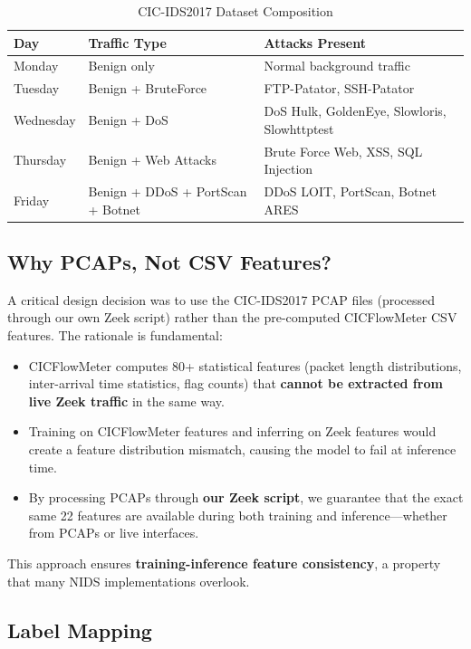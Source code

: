 \documentclass[12pt,a4paper,twoside]{report}
\begin{document}
\begin{table}[H]
\centering
\caption{CIC-IDS2017 Dataset Composition}
\begin{tabularx}{\textwidth}{llX}
\toprule
\textbf{Day} & \textbf{Traffic Type} & \textbf{Attacks Present} \\
\midrule
Monday & Benign only & Normal background traffic \\
Tuesday & Benign + BruteForce & FTP-Patator, SSH-Patator \\
Wednesday & Benign + DoS & DoS Hulk, GoldenEye, Slowloris, Slowhttptest \\
Thursday & Benign + Web Attacks & Brute Force Web, XSS, SQL Injection \\
Friday & Benign + DDoS + PortScan + Botnet & DDoS LOIT, PortScan, Botnet ARES \\
\bottomrule
\end{tabularx}
\end{table}

\subsection{Why PCAPs, Not CSV Features?}

A critical design decision was to use the CIC-IDS2017 PCAP files (processed through our own Zeek script) rather than the pre-computed CICFlowMeter CSV features. The rationale is fundamental:

\begin{itemize}
    \item CICFlowMeter computes 80+ statistical features (packet length distributions, inter-arrival time statistics, flag counts) that \textbf{cannot be extracted from live Zeek traffic} in the same way.
    \item Training on CICFlowMeter features and inferring on Zeek features would create a feature distribution mismatch, causing the model to fail at inference time.
    \item By processing PCAPs through \textbf{our Zeek script}, we guarantee that the exact same 22 features are available during both training and inference—whether from PCAPs or live interfaces.
\end{itemize}

This approach ensures \textbf{training-inference feature consistency}, a property that many NIDS implementations overlook.

\subsection{Label Mapping}
\end{document}

